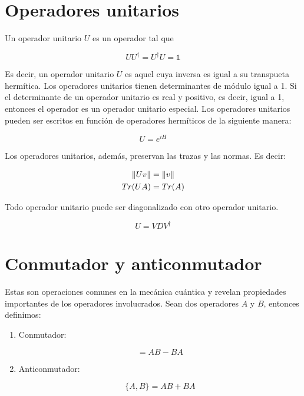 \section{Operadores unitarios}

Un operador unitario $U$ es un operador tal que

\begin{equation}
    U U^\dagger = U^\dagger U = \mathds{1}
\end{equation}

Es decir, un operador unitario $U$ es aquel cuya inversa es igual a su transpueta hermítica. Los operadores unitarios tienen determinantes de módulo igual a 1. Si el determinante de un operador unitario es real y positivo, es decir, igual a 1, entonces el operador es un operador unitario especial. Los operadores unitarios pueden ser escritos en función de operadores hermíticos de la siguiente manera:

\begin{equation}
    U = e^{iH}
\end{equation}

Los operadores unitarios, además, preservan las trazas y las normas. Es decir:

\begin{align}
    \norm{U v} &= \norm{v} \\
    Tr(U A) &= Tr(A)
\end{align}

Todo operador unitario puede ser diagonalizado con otro operador unitario.

\begin{equation}
    U = V D V^\dagger
\end{equation}

\section{Conmutador y anticonmutador}

Estas son operaciones comunes en la mecánica cuántica y revelan propiedades importantes de los operadores involucrados. Sean dos operadores $A$ y $B$, entonces definimos:

\begin{enumerate}
    \item Conmutador:

        \begin{equation}
            [A,B] = A B - B A
        \end{equation}

    \item Anticonmutador:

        \begin{equation}
            \{A,B\} = A B + B A
        \end{equation}
\end{enumerate}

